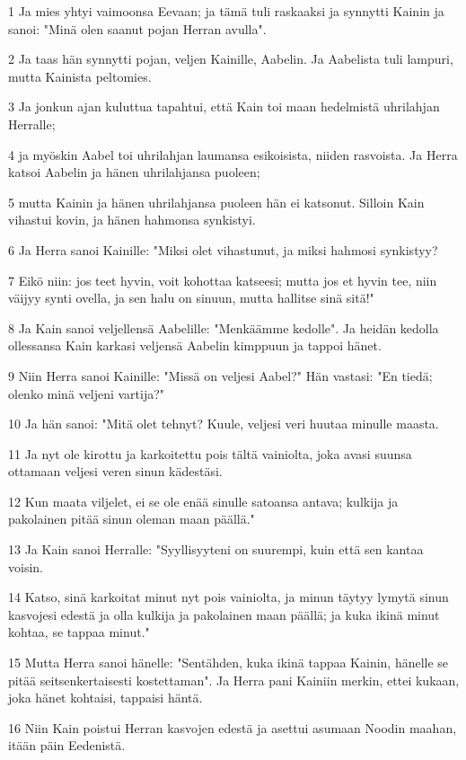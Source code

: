 \par 1 Ja mies yhtyi vaimoonsa Eevaan; ja tämä tuli raskaaksi ja synnytti Kainin ja sanoi: "Minä olen saanut pojan Herran avulla".
\par 2 Ja taas hän synnytti pojan, veljen Kainille, Aabelin. Ja Aabelista tuli lampuri, mutta Kainista peltomies.
\par 3 Ja jonkun ajan kuluttua tapahtui, että Kain toi maan hedelmistä uhrilahjan Herralle;
\par 4 ja myöskin Aabel toi uhrilahjan laumansa esikoisista, niiden rasvoista. Ja Herra katsoi Aabelin ja hänen uhrilahjansa puoleen;
\par 5 mutta Kainin ja hänen uhrilahjansa puoleen hän ei katsonut. Silloin Kain vihastui kovin, ja hänen hahmonsa synkistyi.
\par 6 Ja Herra sanoi Kainille: "Miksi olet vihastunut, ja miksi hahmosi synkistyy?
\par 7 Eikö niin: jos teet hyvin, voit kohottaa katseesi; mutta jos et hyvin tee, niin väijyy synti ovella, ja sen halu on sinuun, mutta hallitse sinä sitä!"
\par 8 Ja Kain sanoi veljellensä Aabelille: "Menkäämme kedolle". Ja heidän kedolla ollessansa Kain karkasi veljensä Aabelin kimppuun ja tappoi hänet.
\par 9 Niin Herra sanoi Kainille: "Missä on veljesi Aabel?" Hän vastasi: "En tiedä; olenko minä veljeni vartija?"
\par 10 Ja hän sanoi: "Mitä olet tehnyt? Kuule, veljesi veri huutaa minulle maasta.
\par 11 Ja nyt ole kirottu ja karkoitettu pois tältä vainiolta, joka avasi suunsa ottamaan veljesi veren sinun kädestäsi.
\par 12 Kun maata viljelet, ei se ole enää sinulle satoansa antava; kulkija ja pakolainen pitää sinun oleman maan päällä."
\par 13 Ja Kain sanoi Herralle: "Syyllisyyteni on suurempi, kuin että sen kantaa voisin.
\par 14 Katso, sinä karkoitat minut nyt pois vainiolta, ja minun täytyy lymytä sinun kasvojesi edestä ja olla kulkija ja pakolainen maan päällä; ja kuka ikinä minut kohtaa, se tappaa minut."
\par 15 Mutta Herra sanoi hänelle: "Sentähden, kuka ikinä tappaa Kainin, hänelle se pitää seitsenkertaisesti kostettaman". Ja Herra pani Kainiin merkin, ettei kukaan, joka hänet kohtaisi, tappaisi häntä.
\par 16 Niin Kain poistui Herran kasvojen edestä ja asettui asumaan Noodin maahan, itään päin Eedenistä.
